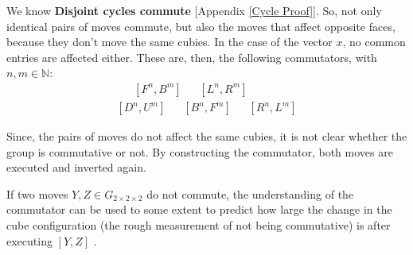 \documentclass[12pt,a4paper]{article}
\theoremstyle{custom}
\newcommand{\Gtwo}{\ensuremath{G_{2\times 2\times 2}}}
\begin{document}
We know \textbf{Disjoint cycles commute} [Appendix \ref{Cycle Proof}]. So, not only identical pairs of moves commute, but also the moves that affect opposite faces, because they don't move the same cubies. In the case of the vector $x$, no common entries are affected either.
These are, then, the following commutators, with $n, m \in \mathbb{N}$:
\begin{align*}
[U^n, D^m] \ \ \ \  \ \ \ [F^n, B^m] \ \ \ \ \ \ \ [L^n, R^m] \\
[D^n, U^m] \ \ \ \ \ \ \  [B^n, F^m] \ \ \ \ \ \ \ [R^n, L^m] 
\end{align*}

Since, the pairs of moves do not affect the same cubies, it is not clear whether the group is commutative or not. By constructing the commutator, both moves are executed and inverted again.


If two moves $Y, Z \in \Gtwo$ do not commute, the understanding of the commutator can be used to some extent to predict how large the change in the cube configuration (the rough measurement of not being commutative) is after executing $[Y, Z]$ .
\end{document}
